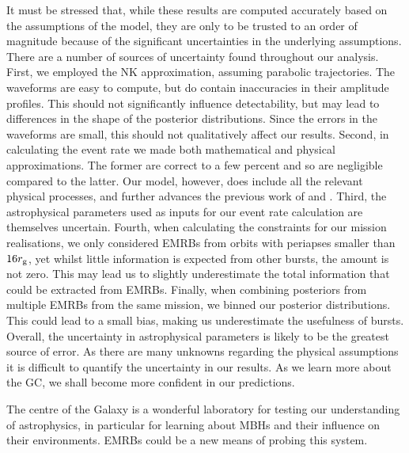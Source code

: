 It must be stressed that, while these results are computed accurately based on the assumptions of the model, they are only to be trusted to an order of magnitude because of the significant uncertainties in the underlying assumptions. There are a number of sources of uncertainty found throughout our analysis. First, we employed the NK approximation, assuming parabolic trajectories. The waveforms are easy to compute, but do contain inaccuracies in their amplitude profiles. This should not significantly influence detectability, but may lead to differences in the shape of the posterior distributions. Since the errors in the waveforms are small, this should not qualitatively affect our results. Second, in calculating the event rate we made both mathematical and physical approximations. The former are correct to a few percent and so are negligible compared to the latter. Our model, however, does include all the relevant physical processes, and further advances the previous work of \citet{Rubbo2006} and \citet{Hopman2007}. Third, the astrophysical parameters used as inputs for our event rate calculation are themselves uncertain. Fourth, when calculating the constraints for our mission realisations, we only considered EMRBs from orbits with periapses smaller than $16 r_\mathrm{g}$, yet whilst little information is expected from other bursts, the amount is not zero. This may lead us to slightly underestimate the total information that could be extracted from EMRBs. Finally, when combining posteriors from multiple EMRBs from the same mission, we binned our posterior distributions. This could lead to a small bias, making us underestimate the usefulness of bursts. Overall, the uncertainty in astrophysical parameters is likely to be the greatest source of error. As there are many unknowns regarding the physical assumptions it is difficult to quantify the uncertainty in our results. As we learn more about the GC, we shall become more confident in our predictions.

The centre of the Galaxy is a wonderful laboratory for testing our understanding of astrophysics, in particular for learning about MBHs and their influence on their environments. EMRBs could be a new means of probing this system.
